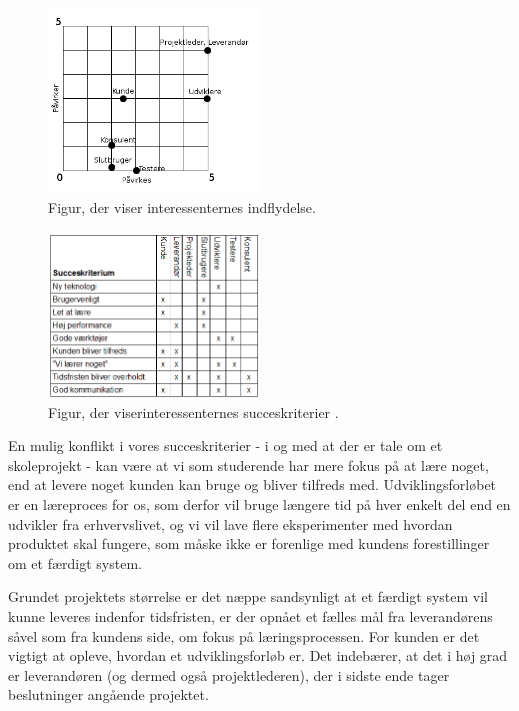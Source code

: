 \documentclass[12pt, a4paper]{report}
\begin{document}
\begin{figure}[h!]
\includegraphics[width=0.5\textwidth]{interessenter}
\caption{Figur, der viser interessenternes indflydelse.}
\end{figure}

\begin{figure}[h!]
  \includegraphics[width=0.5\textwidth]{succeskriterium}
  \caption{Figur, der viserinteressenternes succeskriterier .}
\end{figure}

En mulig konflikt i vores succeskriterier - i og med at der er tale om et skoleprojekt - kan være at vi som studerende har mere fokus på at lære noget, end at levere noget kunden kan bruge og bliver tilfreds med. Udviklingsforløbet er en læreproces for os, som derfor vil bruge længere tid på hver enkelt del end en udvikler fra erhvervslivet, og vi vil lave flere eksperimenter med hvordan produktet skal fungere, som måske ikke er forenlige med kundens forestillinger om et færdigt system.

Grundet projektets størrelse er det næppe sandsynligt at et færdigt system vil kunne leveres indenfor tidsfristen, er der opnået et fælles mål fra leverandørens såvel som fra kundens side, om fokus på læringsprocessen. For kunden er det vigtigt at opleve, hvordan et udviklingsforløb er. Det indebærer, at det i høj grad er leverandøren (og dermed også projektlederen), der i sidste ende tager beslutninger angående projektet.
\end{document}
